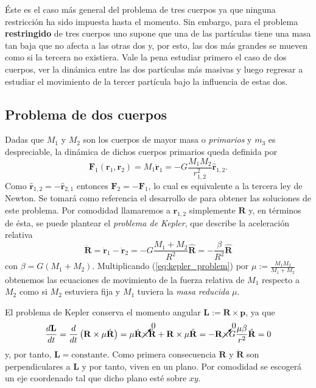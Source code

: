 Éste es el caso más general del problema de tres cuerpos ya que ninguna restricción ha sido impuesta hasta el momento. Sin embargo, para el problema \textbf{restringido} de tres cuerpos uno supone que una de las partículas tiene una masa tan baja que no afecta a las otras dos y, por esto, las dos más grandes se mueven como si la tercera no existiera. Vale la pena estudiar primero el caso de dos cuerpos, ver la dinámica entre las dos partículas más masivas y luego regresar a estudiar el movimiento de la tercer partícula bajo la influencia de estas dos. 

\subsection{Problema de dos cuerpos}
\label{sec:2body_problem}
Dadas que $M_1$ y $M_2$ son los cuerpos de mayor masa o \textit{primarios} y $m_3$ es despreciable, la dinámica de dichos cuerpos primarios queda definida por
\begin{equation}
 \mathbf{F}_1(\mathbf{r}_1,\mathbf{r}_2) = M_1 \ddot{\mathbf{r}}_1 = -G \frac{M_1 M_2}{r_{1,2}^2} \hat{\mathbf{r}}_{1,2}.
 \label{eq:2body_eqs_motion}
\end{equation}
Como $\hat{\mathbf{r}}_{1,2} = - \hat{\mathbf{r}}_{2,1}$ entonces $\mathbf{F}_2 = -\mathbf{F}_1$, lo cual es equivalente a la tercera ley de Newton. Se tomará como referencia el desarrollo de \cite{} para obtener las soluciones de este problema. Por comodidad llamaremos a $\mathbf{r}_{1,2}$ simplemente $\mathbf{R}$ y, en términos de ésta, se puede plantear el \textit{problema de Kepler}, que describe la aceleración relativa
\begin{equation}
 \ddot{\mathbf{R}} = \ddot{\mathbf{r}}_1 - \ddot{\mathbf{r}}_2 = -G \frac{M_1 + M_2}{R^2} \hat{\mathbf{R}} = - \frac{\beta}{R^2}\hat{\mathbf{R}}
 \label{eq:kepler_problem}
\end{equation}
con $\beta = G \left(M_1 + M_2 \right)$. Multiplicando (\ref{eq:kepler_problem}) por $\mu := \frac{M_1 M_2}{M_1+M_2}$ obtenemos las ecuaciones de movimiento de la fuerza relativa de $M_1$ respecto a $M_2$ como si $M_2$ estuviera fija y $M_1$ tuviera la \textit{masa reducida} $\mu$.

El problema de Kepler conserva el momento angular $\mathbf{L} := \mathbf{R} \times \mathbf{p}$, ya que
\begin{equation}
 \frac{d\mathbf{L}}{dt} = \frac{d}{dt}\left(\mathbf{R} \times \mu\dot{\mathbf{R}} \right) = \mu\dot{\mathbf{R}} \cancelto{0}{\times}\dot{\mathbf{R}} + \mathbf{R} \times \mu \ddot{\mathbf{R}} = - \mathbf{R} \cancelto{0}{\times} G\frac{\mu \beta}{r^2}\hat{\mathbf{R}} = 0
\end{equation}
y, por tanto, $\mathbf{L} = \text{constante}$. Como primera consecuencia $\mathbf{R}$ y $\dot{\mathbf{R}}$ son perpendiculares a $\mathbf{L}$ y por tanto, viven en un plano. Por comodidad se escogerá un eje coordenado tal que dicho plano esté sobre $xy$. 

